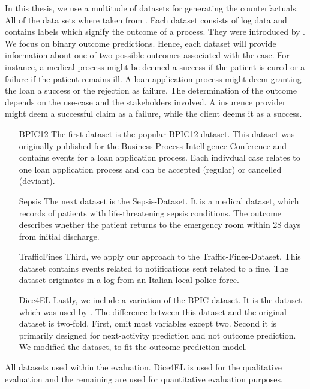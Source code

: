 \documentclass[./../../paper.tex]{subfiles}
\begin{document}
In this thesis, we use a multitude of datasets for generating the counterfactuals. All of the data sets where taken from \citeauthor{teinemaa_OutcomeOrientedPredictiveProcess_2018a}. Each dataset consists of log data and contains labels which signify the outcome of a process. They were introduced by . We focus on binary outcome predictions. Hence, each dataset will provide information about one of two possible outcomes associated with the case. For instance, a medical process might be deemed a success if the patient is cured or a failure if the patient remains ill. A loan application process might deem granting the loan a success or the rejection as failure. The determination of the outcome depends on the use-case and the stakeholders involved. A insurence provider might deem a successful claim as a failure, while the client deems it as a success.

\begin{enumerate}
    \item[BPIC12] The first dataset is the popular BPIC12 dataset. This dataset was originally published for the Business Process Intelligence Conference and contains events for a loan application process. Each indivdual case relates to one loan application process and can be accepted (regular) or cancelled (deviant).
    \item[Sepsis] The next dataset is the Sepsis-Dataset. It is a medical dataset, which records of patients with life-threatening sepsis conditions. The outcome describes whether the patient returns to the emergency room within 28 days from initial discharge.
    \item[TrafficFines] Third, we apply our approach to the Traffic-Fines-Dataset. This dataset contains events related to notifications sent related to a fine. The dataset originates in a log from an Italian local police force.
    \item[Dice4EL] Lastly, we include a variation of the BPIC dataset. It is the dataset which was used by \citeauthor{hsieh_DiCE4ELInterpretingProcess_2021}. The difference between this dataset and the original dataset is two-fold. First, \citeauthor{hsieh_DiCE4ELInterpretingProcess_2021} omit most variables except two. Second it is primarily designed for next-activity prediction and not outcome prediction. We modified the dataset, to fit the outcome prediction model.
\end{enumerate}

\begin{table}[htbp]
    \label{tbl:dataset-stats}
    \caption{All datasets used within the evaluation. Dice4EL is used for the qualitative evaluation and the remaining are used for quantitative evaluation purposes.}
    \begin{adjustbox}{center}
        
    \end{adjustbox}
\end{table}
\end{document}
